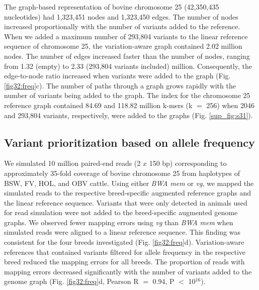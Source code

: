 \documentclass[../main.tex]{subfiles}
\begin{document}
The graph-based representation of bovine chromosome 25 (42,350,435 nucleotides) had 1,323,451 nodes and 1,323,450 edges. The number of nodes increased proportionally with the number of variants added to the reference. When we added a maximum number of 293,804 variants to the linear reference sequence of chromosome 25, the variation-aware graph contained 2.02 million nodes. The number of edges increased faster than the number of nodes, ranging from 1.32 (empty) to 2.33 (293,804 variants included) million. Consequently, the edge-to-node ratio increased when variants were added to the graph (Fig. \ref{fig32:freq}c). The number of paths through a graph grows rapidly with the number of variants being added to the graph. The index for the chromosome 25 reference graph contained 84.69 and 118.82 million k-mers (k $=$ 256) when 2046 and 293,804 variants, respectively, were added to the graphs (Fig. \ref{sup_fig:s31}).


\subsection*{Variant prioritization based on allele frequency}
We simulated 10 million paired-end reads (2 $x$ 150 bp) corresponding to approximately 35-fold coverage of bovine chromosome 25 from haplotypes of BSW, FV, HOL, and OBV cattle. Using either \emph{BWA mem} or \emph{vg}, we mapped the simulated reads to the respective breed-specific augmented reference graphs and the linear reference sequence. Variants that were only detected in animals used for read simulation were not added to the breed-specific augmented genome graphs. We observed fewer mapping errors using \emph{vg} than \emph{BWA mem} when simulated reads were aligned to a linear reference sequence. This finding was consistent for the four breeds investigated (Fig. \ref{fig32:freq}d). Variation-aware references that contained variants filtered for allele frequency in the respective breed reduced the mapping errors for all breeds. The proportion of reads with mapping errors decreased significantly with the number of variants added to the genome graph (Fig. \ref{fig32:freq}d, Pearson R $=$ 0.94, P $<$ 10$^{16}$).
\end{document}
